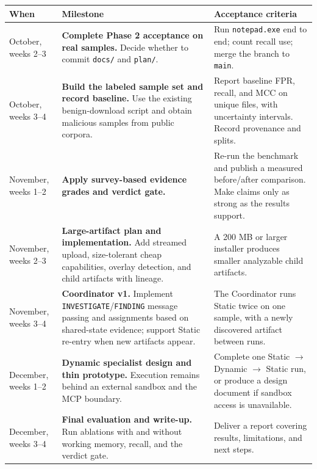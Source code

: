 \documentclass[11pt,a4paper]{article}
\newcommand{\code}[1]{\texttt{\small #1}}
\begin{document}
\small
\begin{longtable}{>{\raggedright\arraybackslash}p{} >{\raggedright\arraybackslash}p{} Y}
\toprule
\textbf{When} & \textbf{Milestone} & \textbf{Acceptance criteria}\\
\midrule
\endhead
October, weeks 2--3 &
\textbf{Complete Phase 2 acceptance on real samples.} Decide whether to commit \code{docs/} and \code{plan/}. &
Run \code{notepad.exe} end to end; count recall use; merge the branch to \code{main}.\\

October, weeks 3--4 &
\textbf{Build the labeled sample set and record baseline.} Use the existing benign-download script and obtain malicious samples from public corpora. &
Report baseline FPR, recall, and MCC on unique files, with uncertainty intervals. Record provenance and splits.\\

November, weeks 1--2 &
\textbf{Apply survey-based evidence grades and verdict gate.} &
Re-run the benchmark and publish a measured before/after comparison. Make claims only as strong as the results support.\\

November, weeks 2--3 &
\textbf{Large-artifact plan and implementation.} Add streamed upload, size-tolerant cheap capabilities, overlay detection, and child artifacts with lineage. &
A 200 MB or larger installer produces smaller analyzable child artifacts.\\

November, weeks 3--4 &
\textbf{Coordinator v1.} Implement \code{INVESTIGATE}/\code{FINDING} message passing and assignments based on shared-state evidence; support Static re-entry when new artifacts appear. &
The Coordinator runs Static twice on one sample, with a newly discovered artifact between runs.\\

December, weeks 1--2 &
\textbf{Dynamic specialist design and thin prototype.} Execution remains behind an external sandbox and the MCP boundary. &
Complete one Static $\rightarrow$ Dynamic $\rightarrow$ Static run, or produce a design document if sandbox access is unavailable.\\

December, weeks 3--4 &
\textbf{Final evaluation and write-up.} Run ablations with and without working memory, recall, and the verdict gate. &
Deliver a report covering results, limitations, and next steps.\\
\bottomrule
\end{longtable}
\normalsize
\end{document}
